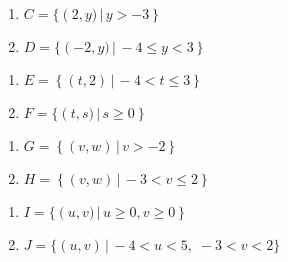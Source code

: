 \documentclass{ximera}
\begin{document}
\begin{multicols}{2}
\begin{enumerate}
\setcounter{enumi}{\value{HW}}

\item $C = \{ \left(2,y) \, | \, y > -3 \right\}$

\item $D = \{ \left(-2,y) \, | \, -4 \leq y < 3 \right\}$

\setcounter{HW}{\value{enumi}}
\end{enumerate}
\end{multicols}

\begin{multicols}{2}
\begin{enumerate}
\setcounter{enumi}{\value{HW}}

\item $E = \left\{ \left(t,2 \right) \, | \, -4 < t \leq 3 \right\}$
\item $F = \{ \left(t,s) \, | \, s \geq 0 \right\}$

\setcounter{HW}{\value{enumi}}
\end{enumerate}
\end{multicols}

\begin{multicols}{2}
\begin{enumerate}
\setcounter{enumi}{\value{HW}}

\item $G = \left\{ \left(v,w \right) \, | \, v > -2 \right\}$
\item $H = \left\{ \left(v,w\right) \, | \, -3 < v \leq 2 \right\}$

\setcounter{HW}{\value{enumi}}
\end{enumerate}
\end{multicols}

\begin{multicols}{2}
\begin{enumerate}
\setcounter{enumi}{\value{HW}}


\item $I = \{ \left(u,v) \, | \, u \geq 0, \! v \geq 0\right\}$

\item $J = \{(u, v) \, | \, -4 < u < 5, \; -3 < v < 2\}$

\setcounter{HW}{\value{enumi}}
\end{enumerate}
\end{multicols}
\end{document}
